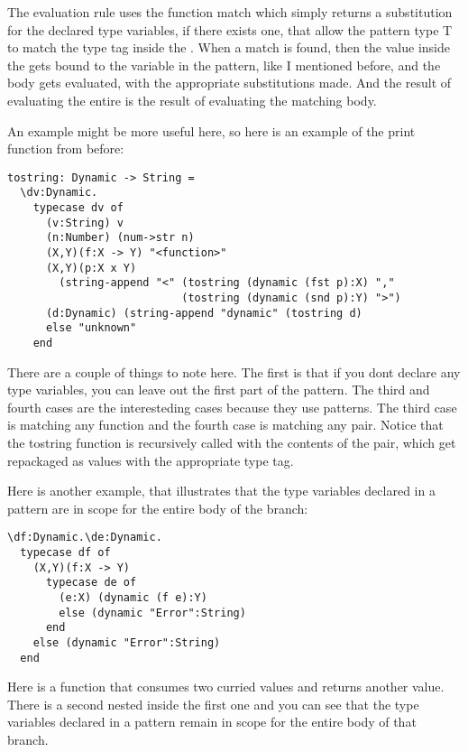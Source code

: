 \documentclass[12pt]{article}	%
\begin{document}
The evaluation rule uses the function match which simply returns a substitution for the declared type variables, if there exists one, that allow the pattern type T to match the type tag inside the \Dynamic. When a match is found, then the value inside the \Dynamic gets bound to the variable in the pattern, like I mentioned before, and the body gets evaluated, with the appropriate substitutions made. And the result of evaluating the entire \typecase is the result of evaluating the matching body.

An example might be more useful here, so here is an example of the print function from before:

\begin{verbatim}
tostring: Dynamic -> String = 
  \dv:Dynamic.
    typecase dv of
      (v:String) v
      (n:Number) (num->str n)
      (X,Y)(f:X -> Y) "<function>"
      (X,Y)(p:X x Y)
        (string-append "<" (tostring (dynamic (fst p):X) ","
                           (tostring (dynamic (snd p):Y) ">")
      (d:Dynamic) (string-append "dynamic" (tostring d)
      else "unknown"
    end
\end{verbatim}

There are a couple of things to note here. The first is that if you dont declare any type variables, you can leave out the first part of the pattern. The third and fourth cases are the interesteding cases because they use patterns. The third case is matching any function and the fourth case is matching any pair. Notice that the tostring function is recursively called with the contents of the pair, which get repackaged as \Dynamic values with the appropriate type tag.

Here is another example, that illustrates that the type variables declared in a pattern are in scope for the entire body of the branch:

\begin{verbatim}
\df:Dynamic.\de:Dynamic.
  typecase df of
    (X,Y)(f:X -> Y)
      typecase de of
        (e:X) (dynamic (f e):Y)
        else (dynamic "Error":String)
      end
    else (dynamic "Error":String)
  end
\end{verbatim}

Here is a function that consumes two curried \Dynamic values and returns another \Dynamic value. There is a second \typecase nested inside the first one and you can see that the type variables declared in a pattern remain in scope for the entire body of that branch.
\end{document}
